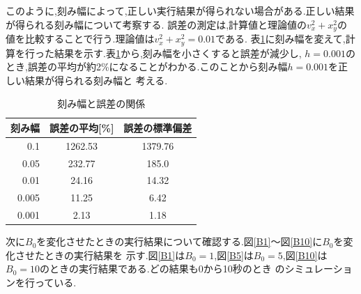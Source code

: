 \documentclass[a4j]{jarticle}
\begin{document}
       このように,刻み幅によって,正しい実行結果が得られない場合がある.正しい結果が得られる刻み幅について考察する.
       誤差の測定は,計算値と理論値の$v_x^2+x_y^2$の値を比較することで行う.理論値は$v_x^2+x_y^2=0.01$である.
       表\ref{sim9h8}に刻み幅を変えて,計算を行った結果を示す.表\ref{sim9h8}から,刻み幅を小さくすると誤差が減少し,
       $h=0.001$のとき,誤差の平均が約2\%になることがわかる.このことから刻み幅$h=0.001$を正しい結果が得られる刻み幅と
       考える.

       \begin{table}[H]
        \caption{刻み幅と誤差の関係}
        \label{sim9h8}
        \begin{center}
        \begin{tabular}{r|c|c}\hline
          刻み幅 & 誤差の平均[\%] & 誤差の標準偏差 \\ \hline \hline 
          0.1 & 1262.53 & 1379.76 \\
          0.05 & 232.77 & 185.0 \\
          0.01 & 24.16 & 14.32 \\
          0.005 & 11.25 & 6.42 \\
          0.001 & 2.13 & 1.18 \\ \hline
        \end{tabular}
        \end{center}
        \end{table}

        次に$B_0$を変化させたときの実行結果について確認する.図\ref{B1}～図\ref{B10}に$B_0$を変化させたときの実行結果を
        示す.図\ref{B1}は$B_0=1$,図\ref{B5}は$B_0=5$,図\ref{B10}は$B_0=10$のときの実行結果である.どの結果も0から10秒のとき
        のシミュレーションを行っている.
\end{document}
